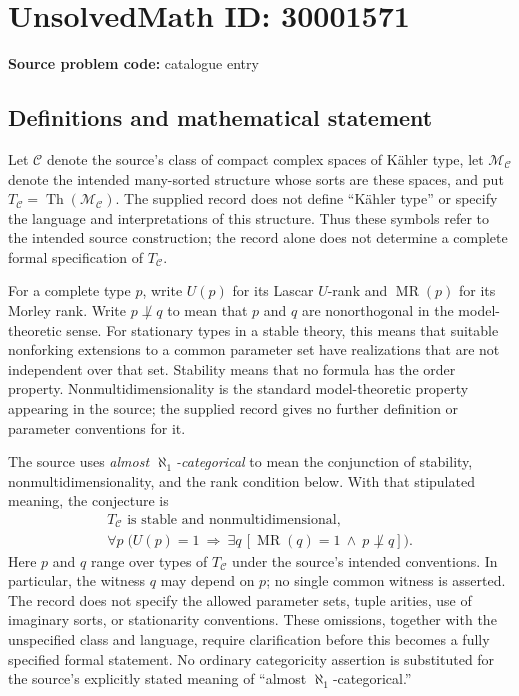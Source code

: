 \documentclass[11pt]{article}
\begin{document}
\section*{UnsolvedMath ID: 30001571}
\textbf{Source problem code:} catalogue entry
\subsection{Definitions and mathematical statement}
Let \(\mathcal C\) denote the source's class of compact complex spaces of K\"ahler type, let \(\mathcal M_{\mathcal C}\) denote the intended many-sorted structure whose sorts are these spaces, and put \(T_{\mathcal C}=\operatorname{Th}(\mathcal M_{\mathcal C})\). The supplied record does not define ``K\"ahler type'' or specify the language and interpretations of this structure. Thus these symbols refer to the intended source construction; the record alone does not determine a complete formal specification of \(T_{\mathcal C}\).

For a complete type \(p\), write \(U(p)\) for its Lascar \(U\)-rank and \(\operatorname{MR}(p)\) for its Morley rank. Write \(p\not\perp q\) to mean that \(p\) and \(q\) are nonorthogonal in the model-theoretic sense. For stationary types in a stable theory, this means that suitable nonforking extensions to a common parameter set have realizations that are not independent over that set. Stability means that no formula has the order property. Nonmultidimensionality is the standard model-theoretic property appearing in the source; the supplied record gives no further definition or parameter conventions for it.

The source uses \emph{almost \(\aleph_1\)-categorical} to mean the conjunction of stability, nonmultidimensionality, and the rank condition below. With that stipulated meaning, the conjecture is
\[
\begin{gathered}
T_{\mathcal C}\text{ is stable and nonmultidimensional},\\
\forall p\;\bigl(U(p)=1\ \Longrightarrow\ \exists q\,
[\operatorname{MR}(q)=1\ \land\ p\not\perp q]\bigr).
\end{gathered}
\]
Here \(p\) and \(q\) range over types of \(T_{\mathcal C}\) under the source's intended conventions. In particular, the witness \(q\) may depend on \(p\); no single common witness is asserted. The record does not specify the allowed parameter sets, tuple arities, use of imaginary sorts, or stationarity conventions. These omissions, together with the unspecified class and language, require clarification before this becomes a fully specified formal statement. No ordinary categoricity assertion is substituted for the source's explicitly stated meaning of ``almost \(\aleph_1\)-categorical.''
\end{document}
